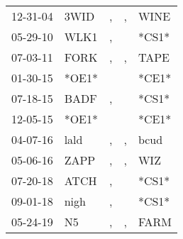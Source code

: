 \begin{supertabular}{lllll}
 12-31-04 &   3WID &  , &  , &   WINE \\
 05-29-10 &   WLK1 &  , &    &  *CS1* \\
 07-03-11 &   FORK &  , &  , &   TAPE \\
 01-30-15 &  *OE1* &    &    &  *CE1* \\
 07-18-15 &   BADF &  , &    &  *CS1* \\
 12-05-15 &  *OE1* &    &    &  *CE1* \\
 04-07-16 &   lald &  , &  , &   bcud \\
 05-06-16 &   ZAPP &  , &  , &    WIZ \\
 07-20-18 &   ATCH &  , &    &  *CS1* \\
 09-01-18 &   nigh &  , &    &  *CS1* \\
 05-24-19 &     N5 &  , &  , &   FARM \\
\end{supertabular}
